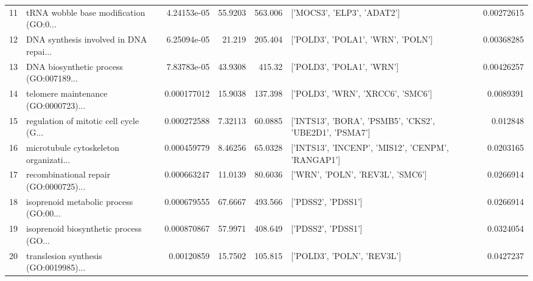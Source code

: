\documentclass{article}
\begin{document}
\begin{table}[h]
\begin{tabular}{rlrrrlr}
     11 & tRNA wobble base modification (GO:0... & 4.24153e-05 &  55.9203  &         563.006  & ['MOCS3', 'ELP3', 'ADAT2']                                                           & 0.00272615  \\
     12 & DNA synthesis involved in DNA repai... & 6.25094e-05 &  21.219   &         205.404  & ['POLD3', 'POLA1', 'WRN', 'POLN']                                                    & 0.00368285  \\
     13 & DNA biosynthetic process (GO:007189... & 7.83783e-05 &  43.9308  &         415.32   & ['POLD3', 'POLA1', 'WRN']                                                            & 0.00426257  \\
     14 & telomere maintenance (GO:0000723)...   & 0.000177012 &  15.9038  &         137.398  & ['POLD3', 'WRN', 'XRCC6', 'SMC6']                                                    & 0.0089391   \\
     15 & regulation of mitotic cell cycle (G... & 0.000272588 &   7.32113 &          60.0885 & ['INTS13', 'BORA', 'PSMB5', 'CKS2', 'UBE2D1', 'PSMA7']                               & 0.012848    \\
     16 & microtubule cytoskeleton organizati... & 0.000459779 &   8.46256 &          65.0328 & ['INTS13', 'INCENP', 'MIS12', 'CENPM', 'RANGAP1']                                    & 0.0203165   \\
     17 & recombinational repair (GO:0000725)... & 0.000663247 &  11.0139  &          80.6036 & ['WRN', 'POLN', 'REV3L', 'SMC6']                                                     & 0.0266914   \\
     18 & isoprenoid metabolic process (GO:00... & 0.000679555 &  67.6667  &         493.566  & ['PDSS2', 'PDSS1']                                                                   & 0.0266914   \\
     19 & isoprenoid biosynthetic process (GO... & 0.000870867 &  57.9971  &         408.649  & ['PDSS2', 'PDSS1']                                                                   & 0.0324054   \\
     20 & translesion synthesis (GO:0019985)...  & 0.00120859  &  15.7502  &         105.815  & ['POLD3', 'POLN', 'REV3L']                                                           & 0.0427237   \\
\hline
\end{tabular}
\end{table}





\end{document}
